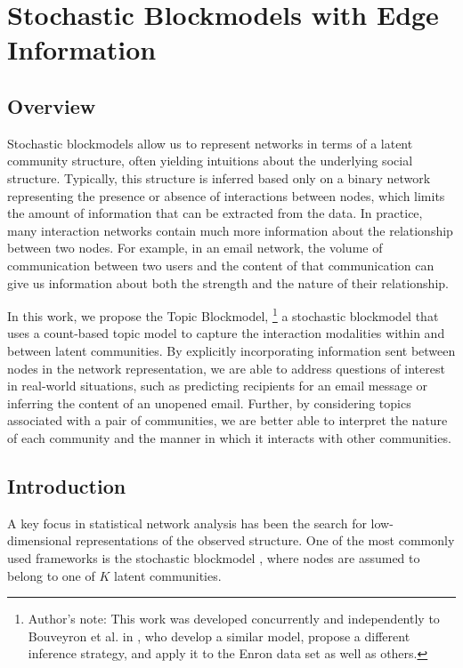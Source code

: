 \chapter{Stochastic Blockmodels with Edge Information}
\label{ch:TopicBlockModel}

\section{Overview}
    Stochastic blockmodels allow us to represent networks in terms of a latent community structure, often yielding intuitions about the underlying social structure. Typically, this structure is inferred based only on a binary network representing the presence or absence of interactions between nodes, which limits the amount of information that can be extracted from the data. In practice, many interaction networks contain much more information about the relationship between two nodes. For example, in an email network, the volume of communication between two users and the content of that communication can give us information about both the strength and the nature of their relationship.

    In this work, we propose the Topic Blockmodel,
        \footnote{Author's note: This work was developed concurrently and independently to Bouveyron et al. in \cite{bouveyron2018stochastic}, who develop a similar model, propose a different inference strategy, and apply it to the Enron data set as well as others.}
    a stochastic blockmodel that uses a count-based topic model to capture the interaction modalities within and between latent communities. By explicitly incorporating information sent between nodes in the network representation, we are able to address questions of interest in real-world situations, such as predicting recipients for an email message or inferring the content of an unopened email. Further, by considering topics associated with a pair of communities, we are better able to interpret the nature of each community and the manner in which it interacts with other communities.  
    
    

\section{Introduction}\label{sec:introduction}

    A key focus in statistical network analysis has been the search for low-dimensional representations of the observed structure. One of the most commonly used frameworks is the stochastic blockmodel \citep{Wang:Wong:1987,Snijders:Nowicki:1997}, where nodes are assumed to belong to one of $K$ latent communities. 
    
